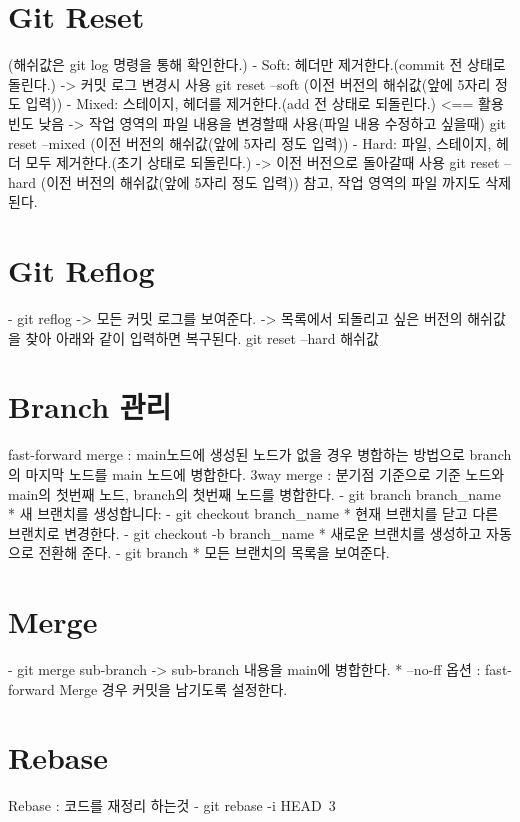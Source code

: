 \documentclass[12pt,a4paper,twoside, footnote]{oblivoir}
\begin{document}
\section[Git Reset]{Git Reset}
  (해쉬값은 git log 명령을 통해 확인한다.)
  - Soft: 헤더만 제거한다.(commit 전 상태로 돌린다.)
    -> 커밋 로그 변경시 사용
    git reset --soft (이전 버전의 해쉬값(앞에 5자리 정도 입력))
  - Mixed: 스테이지, 헤더를 제거한다.(add 전 상태로 되돌린다.)   <== 활용 빈도 낮음
    -> 작업 영역의 파일 내용을 변경할때 사용(파일 내용 수정하고 싶을때)
    git reset --mixed (이전 버전의 해쉬값(앞에 5자리 정도 입력))
  - Hard: 파일, 스테이지, 헤더 모두 제거한다.(초기 상태로 되돌린다.)
    -> 이전 버전으로 돌아갈때 사용
    git reset --hard (이전 버전의 해쉬값(앞에 5자리 정도 입력))
    참고, 작업 영역의 파일 까지도 삭제된다.

\section[Git Reflog]{Git Reflog}
  - git reflog
    -> 모든 커밋 로그를 보여준다.
    -> 목록에서 되돌리고 싶은 버전의 해쉬값을 찾아 아래와 같이 입력하면 복구된다.
       git reset --hard 해쉬값

\section[Branch 관리]{Branch 관리}
fast-forward merge : main노드에 생성된 노드가 없을 경우 병합하는 방법으로 branch의 마지막 노드를 main 노드에 병합한다.
3way merge : 분기점 기준으로 기준 노드와 main의 첫번째 노드, branch의 첫번째 노드를 병합한다.
  - git branch branch_name
    * 새 브랜치를 생성합니다:
  - git checkout branch_name
    * 현재 브랜치를 닫고 다른 브랜치로 변경한다.
  - git checkout -b branch_name
    * 새로운 브랜치를 생성하고 자동으로 전환해 준다.
  - git branch
    * 모든 브랜치의 목록을 보여준다.

\section[Merge]{Merge}
  - git merge sub-branch
    -> sub-branch 내용을 main에 병합한다.
    * --no-ff 옵션 : fast-forward Merge 경우 커밋을 남기도록 설정한다.

\section[Rebase]{Rebase}
Rebase : 코드를 재정리 하는것
  - git rebase -i HEAD~3
\end{document}
